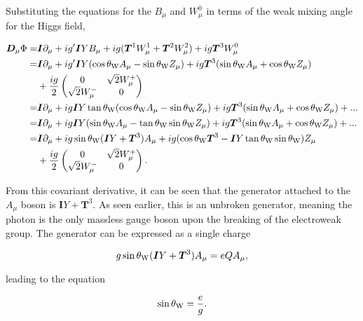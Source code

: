 \documentclass{article}
\begin{document}
Substituting the equations for the $B_\mu$ and $W^{0}_\mu$ in terms of the weak mixing angle for the Higgs field,

\begin{equation}
\begin{split}
\bm{D}_\mu \Phi = & \bm{I}\partial_\mu + ig'\bm{I}YB_\mu + ig(\bm{T}^1W^{1}_\mu +\bm{T}^2 W^{2}_\mu) + ig\bm{T}^3 W^{0}_\mu \\
= & \bm{I}\partial_\mu + ig'\bm{I}Y(\cos\theta_{\rm{W}}A_\mu - \sin\theta_{\rm{W}}Z_\mu) + ig\bm{T}^3(\sin\theta_{\rm{W}}A_\mu + \cos\theta_{\rm{W}}Z_\mu) \\
& + \frac{ig}{2}\left(\begin{matrix} 0 & \sqrt{2}W^{+}_\mu \\ \sqrt{2}W^{-}_\mu & 0 \end{matrix}\right)\\
= & \bm{I}\partial_\mu + ig\bm{I}Y\tan\theta_{\rm{W}}(\cos\theta_{\rm{W}}A_\mu - \sin\theta_{\rm{W}}Z_\mu) + ig\bm{T}^3(\sin\theta_{\rm{W}}A_\mu + \cos\theta_{\rm{W}}Z_\mu) + ...\\
= & \bm{I}\partial_\mu + ig\bm{I}Y(\sin\theta_{\rm{W}}A_\mu - \tan\theta_{\rm{W}}\sin\theta_{\rm{W}}Z_\mu) + ig\bm{T}^3(\sin\theta_{\rm{W}}A_\mu + \cos\theta_{\rm{W}}Z_\mu) + ... \\
= & \bm{I}\partial_\mu + ig\sin\theta_{\rm{W}}(\bm{I}Y+\bm{T}^3)A_\mu + ig(\cos\theta_{\rm{W}}\bm{T}^3 - \bm{I}Y\tan\theta_{\rm{W}}\sin\theta_{\rm{W}})Z_\mu \\
& + \frac{ig}{2}\left(\begin{matrix} 0 & \sqrt{2}W^{+}_\mu \\ \sqrt{2}W^{-}_\mu & 0 \end{matrix}\right).\\
\end{split}
\end{equation} 

From this covariant derivative, it can be seen that the generator attached to the $A_\mu$ boson is $\bm{I}Y+\bm{T}^3$. As seen earlier, this is an unbroken generator, meaning the photon is the only massless gauge boson upon the breaking of the electroweak group. The generator can be expressed as a single charge

\begin{equation}
g\sin\theta_{\rm{W}}(\bm{I}Y + \bm{T}^3)A_\mu = eQA_\mu,
\end{equation}

leading to the equation 

\begin{equation}
\sin\theta_{\rm{W}} = \frac{e}{g}.
\end{equation}
\end{document}

